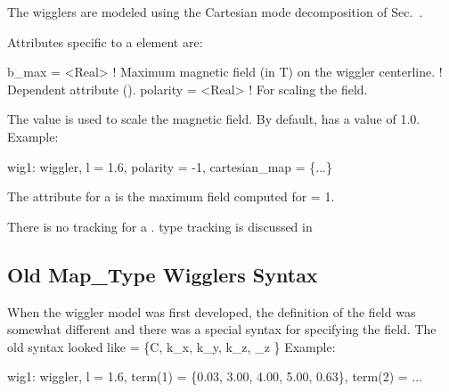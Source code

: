 {The  wigglers are modeled using the Cartesian mode
decomposition of Sec.~. 

Attributes specific to a   element are:
\begin{example}
  b_max    = <Real>   ! Maximum magnetic field (in T) on the wiggler centerline. 
                      !   Dependent attribute ().
  polarity = <Real>   ! For scaling the field.
\end{example}

The  value is used to scale the magnetic field. By
default,  has a value of 1.0.  Example:
\begin{example}
  wig1: wiggler, l = 1.6, polarity = -1, cartesian_map = \{...\}
\end{example}

The  attribute for a   is the
maximum field computed for  = 1.

There is no  tracking for a 
.  type tracking is discussed in 

\subsection{Old Map\_Type Wigglers Syntax}
\label{s:old.wiggler}

When the wiggler model was first developed, the definition of the field was somewhat
different and there was a special syntax for specifying the field. The old syntax looked
like
\Begineq
   = \{C, k_x, k_y, k_z, \phi_z \}
\Endeq
Example:
\begin{example}
  wig1: wiggler, l = 1.6, 
        term(1) = \{0.03, 3.00, 4.00, 5.00, 0.63\},
        term(2) = ...
\end{example}

}
